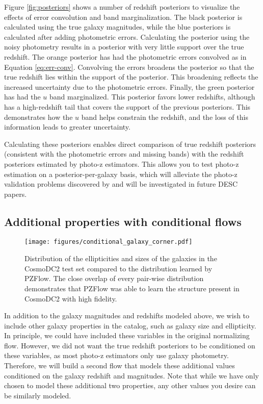 \documentclass[twocolumn]{aastex631}
\begin{document}
Figure \ref{fig:posteriors} shows a number of redshift posteriors to visualize the effects of error convolution and band marginalization.
The black posterior is calculated using the true galaxy magnitudes, while the blue posteriors is calculated after adding photometric errors.
Calculating the posterior using the noisy photometry results in a posterior with very little support over the true redshift.
The orange posterior has had the photometric errors convolved as in Equation \ref{eq:err-conv}.
Convolving the errors broadens the posterior so that the true redshift lies within the support of the posterior.
This broadening reflects the increased uncertainty due to the photometric errors.
Finally, the green posterior has had the $u$ band marginalized.
This posterior favors lower redshifts, although has a high-redshift tail that covers the support of the previous posteriors. 
This demonstrates how the $u$ band helps constrain the redshift, and the loss of this information leads to greater uncertainty.

Calculating these posteriors enables direct comparison of true redshift posteriors (consistent with the photometric errors and missing bands) with the redshift posteriors estimated by photo-z estimators.
This allows you to test photo-z estimation on a posterior-per-galaxy basis, which will alleviate the photo-z validation problems discovered by \citet{schmidt2020} and will be investigated in future DESC papers.


\subsection{Additional properties with conditional flows}
\label{sec:fwd-model-conditional}

\begin{figure*}[t!]
    \begin{centering}
        \texttt{[image: figures/conditional\_galaxy\_corner.pdf]}
        \caption{
            Distribution of the ellipticities and sizes of the galaxies in the CosmoDC2 test set compared to the distribution learned by PZFlow.
            The close overlap of every pair-wise distribution demonstrates that PZFlow was able to learn the structure present in CosmoDC2 with high fidelity.
        }
        \label{fig:conditional-corner}
    \end{centering}
\end{figure*}

In addition to the galaxy magnitudes and redshifts modeled above, we wish to include other galaxy properties in the catalog, such as galaxy size and ellipticity.
In principle, we could have included these variables in the original normalizing flow.
However, we did not want the true redshift posteriors to be conditioned on these variables, as most photo-z estimators only use galaxy photometry.
Therefore, we will build a second flow that models these additional values conditioned on the galaxy redshift and magnitudes.
Note that while we have only chosen to model these additional two properties, any other values you desire can be similarly modeled.
\end{document}
